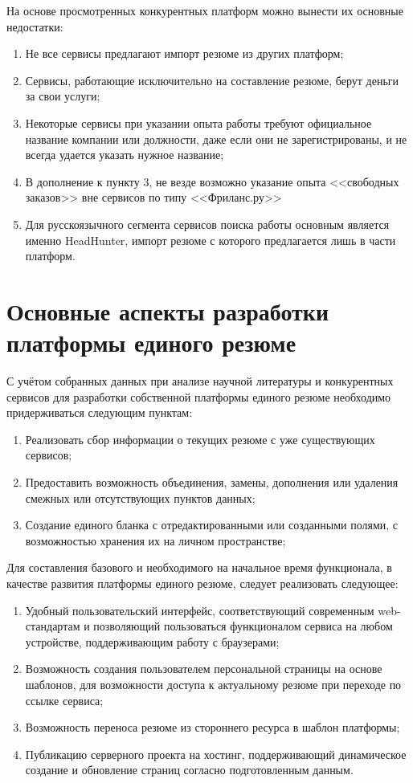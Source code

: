 \documentclass[master, och, coursework]{SCWorks}
\begin{document}
На основе просмотренных конкурентных платформ можно вынести их основные недостатки:
\begin{enumerate}
    \item Не все сервисы предлагают импорт резюме из других платформ;
    \item Сервисы, работающие исключительно на составление резюме, берут деньги за свои услуги;
    \item Некоторые сервисы при указании опыта работы требуют официальное название 
    компании или должности, даже если они не зарегистрированы, 
    и не всегда удается указать нужное название;
    \item В дополнение к пункту 3, не везде возможно указание опыта <<свободных заказов>> 
    вне сервисов по типу <<Фриланс.ру>>
    \item Для русскоязычного сегмента сервисов поиска работы основным является именно 
    HeadHunter, импорт резюме с которого предлагается лишь в части платформ.
\end{enumerate}





\section{Основные аспекты разработки платформы единого резюме}
С учётом собранных данных при анализе научной литературы и конкурентных сервисов 
для разработки собственной платформы единого резюме необходимо придерживаться следующим пунктам:
\begin{enumerate}
    \item Реализовать сбор информации о текущих резюме с уже существующих сервисов;
    \item Предоставить возможность объединения, замены, дополнения или удаления 
    смежных или отсутствующих пунктов данных;
    \item Создание единого бланка с отредактированными или созданными полями, 
    с возможностью хранения их на личном пространстве;
\end{enumerate}

Для составления базового и необходимого на начальное время функционала, в качестве развития 
платформы единого резюме, следует реализовать следующее:
\begin{enumerate}
    \item Удобный пользовательский интерфейс, соответствующий современным web-стандартам 
    и позволяющий пользоваться функционалом сервиса на любом устройстве, поддерживающим 
    работу с браузерами;
    \item Возможность создания пользователем персональной страницы на основе шаблонов, 
    для возможности доступа к актуальному резюме при переходе по ссылке сервиса;
    \item Возможность переноса резюме из стороннего ресурса в шаблон платформы;
    \item Публикацию серверного проекта на хостинг, поддерживающий динамическое 
    создание и обновление страниц согласно подготовленным данным.

\end{enumerate}
\end{document}
